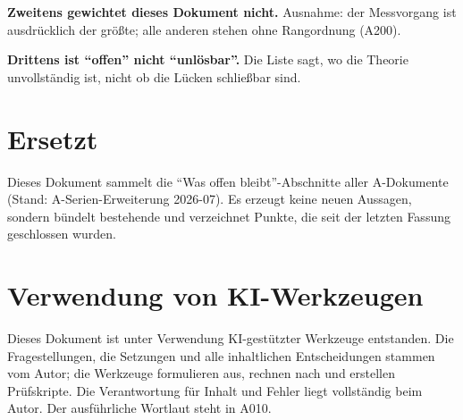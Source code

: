 \textbf{Zweitens gewichtet dieses Dokument nicht.} Ausnahme: der Messvorgang
ist ausdrücklich der größte; alle anderen stehen ohne Rangordnung (A200).

\textbf{Drittens ist \enquote{offen} nicht \enquote{unlösbar}.} Die Liste sagt,
wo die Theorie unvollständig ist, nicht ob die Lücken schließbar sind.

\section{Ersetzt}

Dieses Dokument sammelt die \enquote{Was offen bleibt}-Abschnitte aller
A-Dokumente (Stand: A-Serien-Erweiterung 2026-07). Es erzeugt keine neuen
Aussagen, sondern bündelt bestehende und verzeichnet Punkte, die seit der
letzten Fassung geschlossen wurden.

\section{Verwendung von KI-Werkzeugen}

Dieses Dokument ist unter Verwendung KI-gestützter Werkzeuge entstanden. Die
Fragestellungen, die Setzungen und alle inhaltlichen Entscheidungen stammen vom
Autor; die Werkzeuge formulieren aus, rechnen nach und erstellen Prüfskripte.
Die Verantwortung für Inhalt und Fehler liegt vollständig beim Autor. Der
ausführliche Wortlaut steht in A010.

